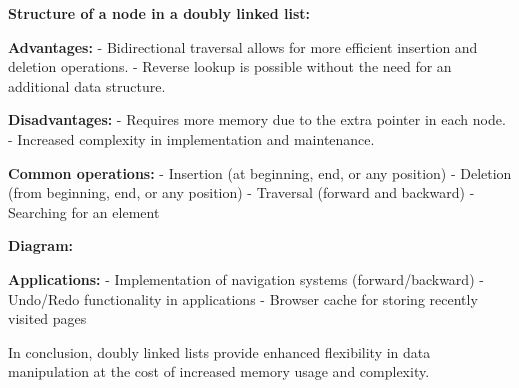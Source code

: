 \textbf{Structure of a node in a doubly linked list:}

\begin{Shaded}
\begin{Highlighting}[]
     \NormalTok{(}
        \OperatorTok{=}
         \OperatorTok{=} 
        \OperatorTok{=} 
\end{Highlighting}
\end{Shaded}

\textbf{Advantages:} - Bidirectional traversal allows for more efficient
insertion and deletion operations. - Reverse lookup is possible without
the need for an additional data structure.

\textbf{Disadvantages:} - Requires more memory due to the extra pointer
in each node. - Increased complexity in implementation and maintenance.

\textbf{Common operations:} - Insertion (at beginning, end, or any
position) - Deletion (from beginning, end, or any position) - Traversal
(forward and backward) - Searching for an element

\textbf{Diagram:}

\begin{Shaded}
\begin{Highlighting}[]
\end{Highlighting}
\end{Shaded}

\textbf{Applications:} - Implementation of navigation systems
(forward/backward) - Undo/Redo functionality in applications - Browser
cache for storing recently visited pages

In conclusion, doubly linked lists provide enhanced flexibility in data
manipulation at the cost of increased memory usage and complexity.

